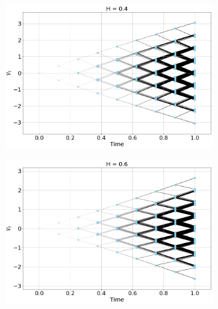 \documentclass[12pt]{article}
\numberwithin{equation}{section}
\begin{document}
\begin{figure}[htb!]
\begin{center}
  
  \begin{subfigure}{0.5\textwidth}
    \centering
    \includegraphics[width=1.0\textwidth]{vol_tree_H04}
    \label{fig:1}
  \end{subfigure}%
  \begin{subfigure}{0.5\textwidth}
    \centering
    \includegraphics[width=1.0\textwidth]{vol_tree_H06}
    \label{fig:2}
  \end{subfigure}\\
  


\end{center}
\end{figure}
\end{document}
